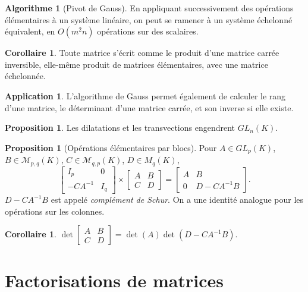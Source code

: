 \documentclass[11pt,a4paper,twocolumn]{article}
\theoremstyle{definition}
\newtheorem{proposition}[equation]{Proposition}
\newtheorem{application}[equation]{Application}
\newtheorem{algo}[equation]{Algorithme}
\newtheorem{corollary}[equation]{Corollaire}
\newcounter{n}
\def\M{\mathcal{M}}
\begin{document}
\begin{algo}[Pivot de Gauss]
  En appliquant successivement des opérations élémentaires à un système
  linéaire, on peut se ramener à un système échelonné équivalent, en $O(m^2 n)$
  opérations sur des scalaires.
\end{algo}
\begin{corollary}
  Toute matrice s'écrit comme le produit d'une matrice carrée inversible,
  elle-même produit de matrices élémentaires, avec une matrice échelonnée.
\end{corollary}
\begin{application}
  L'algorithme de Gauss permet également de calculer le rang d'une matrice, le
  déterminant d'une matrice carrée, et son inverse si elle existe.
\end{application}

\begin{proposition}
  Les dilatations et les transvections engendrent $GL_n(K)$.
\end{proposition}

\begin{proposition}[Opérations élémentaires par blocs]
Pour $A \in GL_p(K)$, $B \in \M_{p,q}(K)$, $C \in \M_{q,p}(K)$, $D \in M_q(K)$,
\[
  \left[\begin{matrix} I_p & 0 \\ -CA^{-1} & I_q \end{matrix}\right] \times
  \left[\begin{matrix} A & B \\ C & D \end{matrix}\right] =
  \left[\begin{matrix} A & B \\ 0 & D - CA^{-1}B \end{matrix}\right].
\]
$D - CA^{-1}B$ est appelé \emph{complément de Schur}. On a une identité analogue
pour les opérations sur les colonnes.
\end{proposition}
\begin{corollary}
  $\displaystyle \det \left[\begin{matrix} A & B \\ C & D \end{matrix}\right] =
  \det(A) \det (D - CA^{-1}B)$.
\end{corollary}

\section{Factorisations de matrices}
\end{document}
